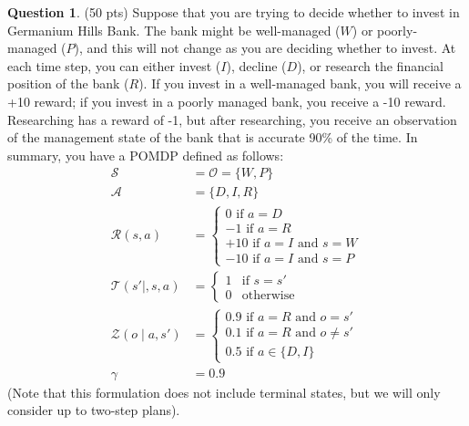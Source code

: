 \documentclass{article}
\theoremstyle{definition}
\newtheorem{question}[thm]{Question}
\begin{document}
\clearpage

\begin{question} (50 pts)
    Suppose that you are trying to decide whether to invest in Germanium Hills Bank. The bank might be well-managed ($W$) or poorly-managed ($P$), and this will not change as you are deciding whether to invest. At each time step, you can either invest ($I$), decline ($D$), or research the financial position of the bank ($R$). If you invest in a well-managed bank, you will receive a +10 reward; if you invest in a poorly managed bank, you receive a -10 reward. Researching has a reward of -1, but after researching, you receive an observation of the management state of the bank that is accurate 90\% of the time.
    In summary, you have a POMDP defined as follows:
    \begin{align}
        \mathcal{S} &= \mathcal{O} = \{W, P\} \quad \\
        \mathcal{A} &= \{D, I, R\} \\
        \mathcal{R}(s, a) &= \begin{cases}
            0 \text{ if } a = D \\
            -1 \text{ if } a = R \\
            +10 \text{ if } a = I \text{ and } s = W \\
            -10 \text{ if } a = I \text{ and } s = P
        \end{cases} \\
        \mathcal{T}(s' \mid, s, a) &= \begin{cases}
            1 & \text{if } s = s' \\
            0 & \text{otherwise}
        \end{cases} \\
        \mathcal{Z}(o \mid a, s') &= \begin{cases}
            0.9 \text{ if } a = R \text{ and } o = s' \\
            0.1 \text{ if } a = R \text{ and } o \neq s' \\
            0.5 \text{ if } a \in \{D, I\}
        \end{cases} \\
        \gamma &= 0.9
    \end{align}
    (Note that this formulation does not include terminal states, but we will only consider up to two-step plans).


\end{question}
\end{document}
